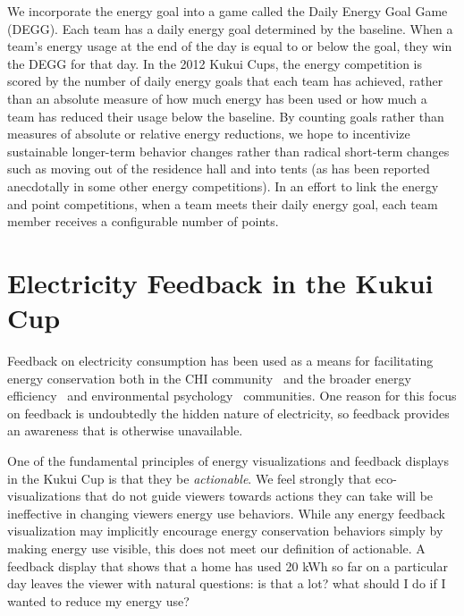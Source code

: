 \documentclass{sigchi}
\begin{document}
We incorporate the energy goal into a game called the Daily Energy Goal Game (DEGG). Each team has a daily energy goal determined by the baseline. When a team's energy usage at the end of the day is equal to or below the goal, they win the DEGG for that day. In the 2012 Kukui Cups, the energy competition is scored by the number of daily energy goals that each team has achieved, rather than an absolute measure of how much energy has been used or how much a team has reduced their usage below the baseline. By counting goals rather than measures of absolute or relative energy reductions, we hope to incentivize sustainable longer-term behavior changes rather than radical short-term changes such as moving out of the residence hall and into tents (as has been reported anecdotally in some other energy competitions). In an effort to link the energy and point competitions, when a team meets their daily energy goal, each team member receives a configurable number of points.


\section{Electricity Feedback in the Kukui Cup}

Feedback on electricity consumption has been used as a means for facilitating energy conservation both in the CHI community~\cite{Froehlich2010} and the broader energy efficiency~\cite{darby-review-2006, Faruqui09, Foster-2012} and environmental psychology~\cite{Becker78, Houwelingen89} communities. One reason for this focus on feedback is undoubtedly the hidden nature of electricity, so feedback provides an awareness that is otherwise unavailable.

One of the fundamental principles of energy visualizations and feedback displays in the Kukui Cup is that they be \emph{actionable}. We feel strongly that eco-visualizations that do not guide viewers towards actions they can take will be ineffective in changing viewers energy use behaviors. While any energy feedback visualization may implicitly encourage energy conservation behaviors simply by making energy use visible, this does not meet our definition of actionable. A feedback display that shows that a home has used 20 kWh so far on a particular day leaves the viewer with natural questions: is that a lot? what should I do if I wanted to reduce my energy use?
\end{document}
